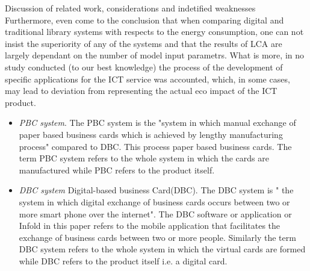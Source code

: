 Discussion of related work, considerations and indetified weaknesses\\


Furthermore, \cite{gard2002digital} even come to the conclusion that when comparing digital and traditional library systems with respects to the energy consumption, one can not insist the superiority of any of the systems and that the results of LCA are largely dependant on the number of model input parametrs. What is more, in no study conducted (to our best knowledge) the process of the development of specific applications for the ICT service was accounted, which, in some cases, may lead to deviation from representing the actual eco impact of the ICT product.



\begin{itemize}
\item {\em PBC system}. The PBC system is the "system in which manual exchange of paper based business cards which is achieved by lengthy manufacturing process" compared to DBC. This process  paper based business cards. The term PBC system refers to the whole system in which the cards are manufactured while PBC refers to the product itself.


\item {\em DBC system} Digital-based business Card(DBC). The DBC system is " the system in which digital exchange of business cards occurs between two or more smart phone over the internet". The DBC software or application or Infold in this paper refers to the mobile application that facilitates the exchange of business cards between two or more people. Similarly the term DBC system refers to the whole system in which the virtual cards are formed while DBC refers to the product itself i.e.  a digital card.
\end{itemize} 